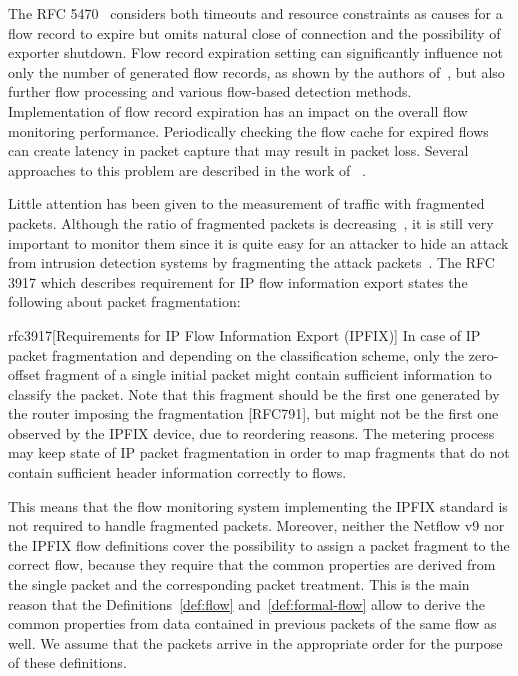 The RFC 5470~\cite{rfc5470} considers both timeouts and resource constraints as causes for a flow record to expire but omits natural close of connection and the possibility of exporter shutdown. Flow record expiration setting can significantly influence not only the  number of generated flow records, as shown by the authors of~\cite{Rodriguez-2013-Empirical}, but also further flow processing and various flow-based detection methods. Implementation of flow record expiration has an impact on the overall flow monitoring performance. Periodically checking the flow cache for expired flows can create latency in packet capture that may result in packet loss. Several approaches to this problem are described in the work of \citeauthor{Molina-2006-Design}~\cite{Molina-2006-Design}.


Little attention has been given to the measurement of traffic with fragmented packets. Although the ratio of fragmented packets is decreasing~\cite{Murray-2012-State}, it is still very important to monitor them since it is quite easy for an attacker to hide an attack from intrusion detection systems by fragmenting the attack packets~\cite{Cheng-2012-Evasion}. The RFC 3917 which describes requirement for IP flow information export states the following about packet fragmentation:

\begin{displaycquote}{rfc3917}[Requirements for IP Flow Information Export (IPFIX)]
   In case of IP packet fragmentation and depending on the
   classification scheme, only the zero-offset fragment of a single
   initial packet might contain sufficient information to classify the
   packet.  Note that this fragment should be the first one generated by
   the router imposing the fragmentation [RFC791], but might not be the
   first one observed by the IPFIX device, due to reordering reasons.
   The metering process may keep state of IP packet fragmentation in
   order to map fragments that do not contain sufficient header
   information correctly to flows.
\end{displaycquote}

This means that the flow monitoring system implementing the IPFIX standard is not required to handle fragmented packets. Moreover, neither the Netflow v9 nor the IPFIX flow definitions cover the possibility to assign a packet fragment to the correct flow, because they require that the common properties are derived from the single packet and the corresponding packet treatment. This is the main reason that the Definitions~\ref{def:flow} and~\ref{def:formal-flow} allow to derive the common properties from data contained in previous packets of the same flow as well. We assume that the packets arrive in the appropriate order for the purpose of these definitions.

